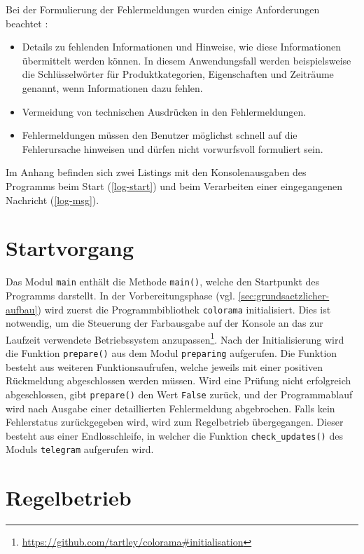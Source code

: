 Bei der Formulierung der Fehlermeldungen wurden einige Anforderungen beachtet \cite[S. 495]{ux}: 

\begin{itemize}
\item Details zu fehlenden Informationen und Hinweise, wie diese Informationen übermittelt werden können. In diesem Anwendungsfall werden beispielsweise die Schlüsselwörter für Produktkategorien, Eigenschaften und Zeiträume genannt, wenn Informationen dazu fehlen.
\item Vermeidung von technischen Ausdrücken in den Fehlermeldungen.
\item Fehlermeldungen müssen den Benutzer möglichst schnell auf die Fehlerursache hinweisen und dürfen nicht vorwurfsvoll formuliert sein.
\end{itemize}

Im Anhang befinden sich zwei Listings mit den Konsolenausgaben des Programms beim Start (\autoref{log-start}) und beim Verarbeiten einer eingegangenen Nachricht (\autoref{log-msg}).

\section{Startvorgang}
\label{sec:startvorgang}

Das Modul \lstinline{main} enthält die Methode \lstinline{main()}, welche den Startpunkt des Programms darstellt. In der Vorbereitungsphase (vgl. \autoref{sec:grundsaetzlicher-aufbau}) wird zuerst die Programmbibliothek \lstinline{colorama} initialisiert. Dies ist notwendig, um die Steuerung der Farbausgabe auf der Konsole an das zur Laufzeit verwendete Betriebssystem anzupassen\footnote{\url{https://github.com/tartley/colorama\#initialisation}}. Nach der Initialisierung wird die Funktion \lstinline{prepare()} aus dem Modul \lstinline{preparing} aufgerufen. Die Funktion besteht aus weiteren Funktionsaufrufen, welche jeweils mit einer positiven Rückmeldung abgeschlossen werden müssen. Wird eine Prüfung nicht erfolgreich abgeschlossen, gibt \lstinline{prepare()} den Wert \lstinline{False} zurück, und der Programmablauf wird nach Ausgabe einer detaillierten Fehlermeldung abgebrochen. Falls kein Fehlerstatus zurückgegeben wird, wird zum Regelbetrieb übergegangen. Dieser besteht aus einer Endlosschleife, in welcher die Funktion \lstinline{check_updates()} des Moduls \lstinline{telegram} aufgerufen wird.

\section{Regelbetrieb}

